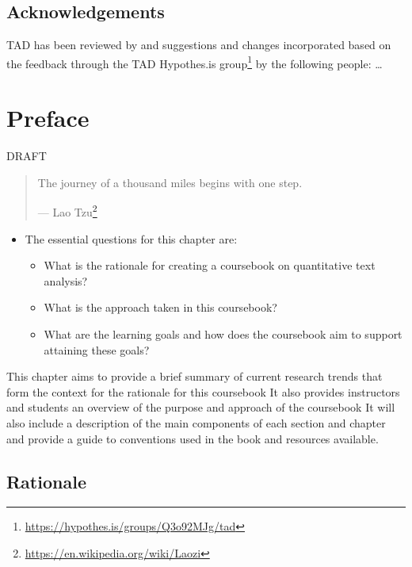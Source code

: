\documentclass[
]{article}
\DeclareRobustCommand{\href}[2]{#2\footnote{\url{#1}}}
\providecommand{\tightlist}{%
  \setlength{\itemsep}{0pt}\setlength{\parskip}{0pt}}
\newenvironment{rmdblock}[1]
  {\begin{shaded*}
  \begin{itemize}
  \renewcommand{\labelitemi}{
    \raisebox{-.5\height}[0pt][0pt]{
      {\setkeys{Gin}{width=2em,keepaspectratio}\texttt{[image: assets/images/\#1]}}
    }
  }
  \item
  }
  {
  \end{itemize}
  \end{shaded*}
  }
\newenvironment{rmdkey}
  {\begin{rmdblock}{key}}
  {\end{rmdblock}}
\begin{document}
\hypertarget{acknowledgements}{%
\subsection*{Acknowledgements}\label{acknowledgements}}

TAD has been reviewed by and suggestions and changes incorporated based on the feedback through \href{https://hypothes.is/groups/Q3o92MJg/tad}{the TAD Hypothes.is group} by the following people: \ldots{}

\hypertarget{preface}{%
\section*{Preface}\label{preface}}

DRAFT

\begin{quote}
The journey of a thousand miles begins with one step.

--- \href{https://en.wikipedia.org/wiki/Laozi}{Lao Tzu}
\end{quote}

\begin{rmdkey}
The essential questions for this chapter are:

\begin{itemize}
\tightlist
\item
  What is the rationale for creating a coursebook on quantitative text
  analysis?
\item
  What is the approach taken in this coursebook?
\item
  What are the learning goals and how does the coursebook aim to support
  attaining these goals?
\end{itemize}
\end{rmdkey}

This chapter aims to provide a brief summary of current research trends that form the context for the rationale for this coursebook It also provides instructors and students an overview of the purpose and approach of the coursebook It will also include a description of the main components of each section and chapter and provide a guide to conventions used in the book and resources available.

\hypertarget{rationale}{%
\subsection*{Rationale}\label{rationale}}
\end{document}
